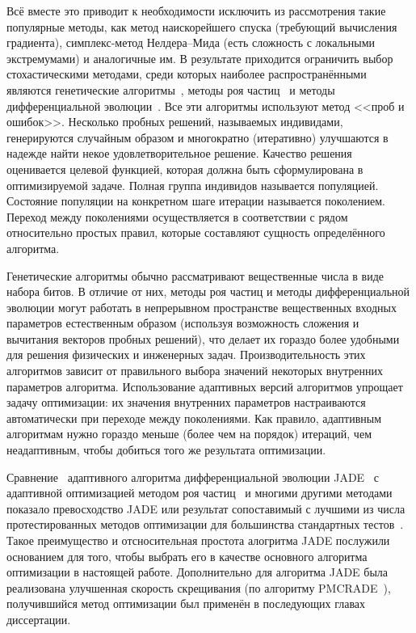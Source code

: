 Всё вместе это приводит к необходимости исключить из рассмотрения
такие популярные методы, как метод наискорейшего спуска (требующий
вычисления градиента), симплекс-метод Нелдера--Мида (есть сложность с
локальными экстремумами) и аналогичные им. В результате приходится
ограничить выбор стохастическими методами, среди которых наиболее
распространёнными являются генетические
алгоритмы~\cite{Goldberg-GA-1989}, методы роя
частиц~\cite{Kennedy-PSO-1995} и методы дифференциальной
эволюции~\cite{Storn-DE-first-1997}.  Все эти алгоритмы используют
метод <<проб и ошибок>>.  Несколько пробных решений, называемых
индивидами, генерируются случайным образом и многократно (итеративно)
улучшаются в надежде найти некое удовлетворительное решение. Качество
решения оценивается целевой функцией, которая должна быть
сформулирована в оптимизируемой задаче.  Полная группа индивидов
называется популяцией.  Состояние популяции на конкретном шаге
итерации называется поколением.  Переход между поколениями
осуществляется в соответствии с рядом относительно простых правил,
которые составляют сущность определённого алгоритма.

Генетические алгоритмы обычно рассматривают вещественные числа в виде
набора битов.  В отличие от них, методы роя частиц и методы
дифференциальной эволюции могут работать в непрерывном пространстве
вещественных входных параметров естественным образом (используя
возможность сложения и вычитания векторов пробных решений), что делает
их гораздо более удобными для решения физических и инженерных
задач.  Производительность этих алгоритмов зависит от правильного
выбора значений некоторых внутренних параметров
алгоритма.  Использование адаптивных версий алгоритмов упрощает задачу
оптимизации: их значения внутренних параметров настраиваются
автоматически при переходе между поколениями. Как правило, адаптивным
алгоритмам нужно гораздо меньше (более чем на порядок) итераций, чем
неадаптивным, чтобы добиться того же результата оптимизации.

Сравнение~\cite{Gong-compare-EA-2014,Kang-compare-EA-RABC-2011}
адаптивного алгоритма дифференциальной эволюции
JADE~\cite{Jingqiao-JADE-2009} с адаптивной оптимизацией методом роя
частиц~\cite{Zhan-APSO-2008} и многими другими методами показало
превосходство JADE или результат сопоставимый с лучшими из числа
протестированных методов оптимизации для большинства стандартных
тестов~\cite{Schwefel-1981,Rosenbrock-1960,Muhlenbein-1991,back-1996,Griewank-1981}.
Такое преимущество и отсносительная простота алогритма JADE послужили
основанием для того, чтобы выбрать его в качестве основного алгоритма
оптимизации в настоящей работе. Дополнительно для алгоритма JADE была
реализована улучшенная скорость скрещивания (по алгоритму
PMCRADE~\cite{Li-PMCRADE-2011}), получившийся метод оптимизации был
применён в последующих главах диссертации.

